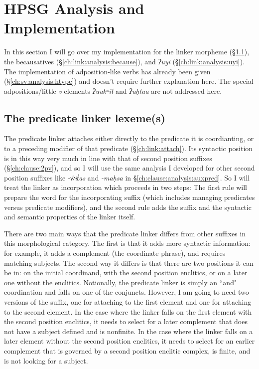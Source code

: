 \section{HPSG Analysis and Implementation} \label{ch:link:analysis}

In this section I will go over my implementation for the linker morpheme (\S\ref{ch:link:analysis:linker}), the becausatives (\S\ref{ch:link:analysis:because}), and \textit{ʔuyi} (\S\ref{ch:link:analysis:uyi}). The implementation of adposition-like verbs has already been given (\S\ref{ch:sv:analysis:htype}) and doesn't require further explanation here. The special adpositions/little-\textit{v} elements \textit{ʔuukʷił} and \textit{ʔuḥtaa} are not addressed here.

\subsection{The predicate linker lexeme(s)} \label{ch:link:analysis:linker}

The predicate linker attaches either directly to the predicate it is coordianting, or to a preceding modifier of that predicate (\S\ref{ch:link:attach}). Its syntactic position is in this way very much in line with that of second position suffixes (\S\ref{ch:clause:2pv}), and so I will use the same analysis I developed for other second position suffixes like \textit{-w̓it̓as} and \textit{-maḥsa} in \S\ref{ch:clause:analysis:auxpred}. So I will treat the linker as incorporation which proceeds in two steps: The first rule will prepare the word for the incorporating suffix (which includes managing predicates versus predicate modifiers), and the second rule adds the suffix and the syntactic and semantic properties of the linker itself.

There are two main ways that the predicate linker differs from other suffixes in this morphological category. The first is that it adds more syntactic information: for example, it adds a complement (the coordinate phrase), and requires matching subjects. The second way it differs is that there are two positions it can be in: on the initial coordinand, with the second position enclitics, or on a later one without the enclitics. Notionally, the predicate linker is simply an ``and" coordination and falls on one of the conjuncts. However, I am going to need two versions of the suffix, one for attaching to the first element and one for attaching to the second element. In the case where the linker falls on the first element with the second position enclitics, it needs to select for a later complement that does not have a subject defined and is nonfinite. In the case where the linker falls on a later element without the second position enclitics, it needs to select for an earlier complement that is governed by a second position enclitic complex, is finite, and is not looking for a subject.

